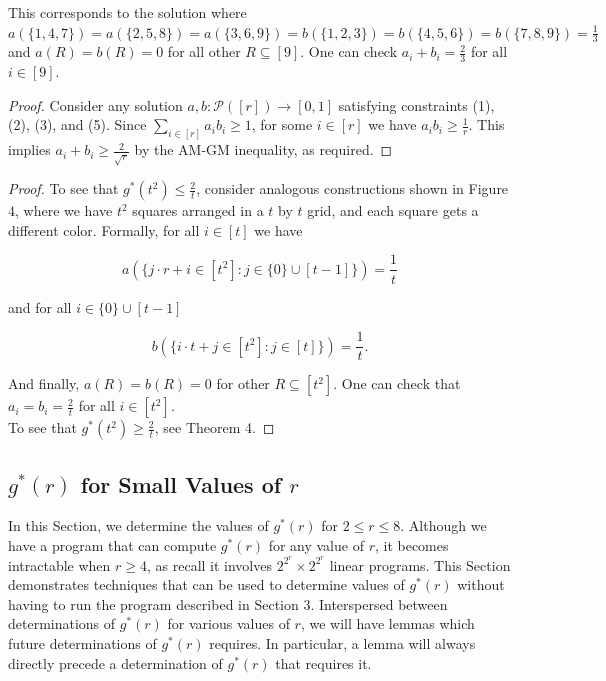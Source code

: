 \documentclass{article}
\begin{document}
\noindent
This corresponds to the solution where $a(\{1,4,7\}) = a(\{2,5,8\}) = a(\{3,6,9\}) = b(\{1,2,3\}) = b(\{4,5,6\}) = b(\{7,8,9\}) = \frac{1}{3}$ and $a(R) = b(R) = 0$ for all other $R \subseteq [9]$. One can check $a_i + b_i = \frac{2}{3}$ for all $i \in [9]$. 

\squarelower*

\begin{proof}
Consider any solution $a,b : \mathcal{P}([r]) \rightarrow [0,1]$ satisfying constraints (1), (2), (3), and (5). Since $\sum_{i \in [r]} a_ib_i \geq 1$, for some $i \in [r]$ we have $a_ib_i \geq \frac{1}{r}$. This implies $a_i+b_i \geq \frac{2}{\sqrt{r}}$ by the AM-GM inequality, as required. 
\end{proof}

\square*

\begin{proof}
To see that $g^*(t^2) \leq \frac{2}{t}$, consider analogous constructions shown in Figure $4$, where we have $t^2$ squares arranged in a $t$ by $t$ grid, and each square gets a different color. Formally, for all $i \in [t]$ we have 

$$a(\{j \cdot r + i \in [t^2] : j \in \{0\} \cup [t-1]\}) = \frac{1}{t}$$ 

\noindent 
and for all $i \in \{0\} \cup [t-1]$

$$b(\{ i \cdot t + j \in [t^2] : j \in [t]\}) = \frac{1}{t}.$$

\noindent
And finally, $a(R) = b(R) = 0$ for other $R \subseteq [t^2]$. One can check that $a_i = b_i = \frac{2}{t}$ for all $i \in [t^2]$. \\

To see that $g^*(t^2) \geq \frac{2}{t}$, see Theorem 4. 
\end{proof}

\begin{center}
\section{$g^*(r)$ for Small Values of $r$}
\end{center}

In this Section, we determine the values of $g^*(r)$ for $2 \leq r \leq 8$. Although we have a program that can compute $g^*(r)$ for any value of $r$, it becomes intractable when $r \geq 4$, as recall it involves $2^{2^r} \times 2^{2^r}$ linear programs. This Section demonstrates techniques that can be used to determine values of $g^*(r)$ without having to run the program described in Section 3. Interspersed between determinations of $g^*(r)$ for various values of $r$, we will have lemmas which future determinations of $g^*(r)$ requires. In particular, a lemma will always directly precede a determination of $g^*(r)$ that requires it. \\
\end{document}
